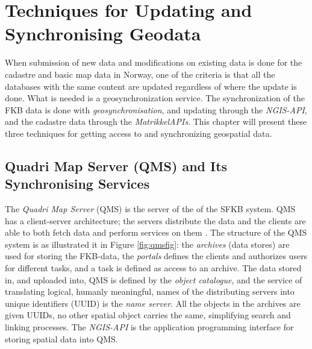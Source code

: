 \chapter{Techniques for Updating and Synchronising Geodata} \label{chap:tech}
When submission of new data and modifications on existing data is done for the cadastre and basic map data in Norway, one of the criteria is that all the databases with the same content are updated regardless of where the update is done. What is needed is a geosynchronization service. The synchronization of the FKB data is done with \textit{geosynchronisation}, and updating through the \textit{NGIS-API}, and the cadastre data through the \textit{MatrikkelAPIs}.  This chapter will present these three techniques for getting access to and synchronizing geospatial data.  


\section{Quadri Map Server (QMS) and Its Synchronising Services}\label{ngis}
The \textit{Quadri Map Server} (QMS) is the server of the of the SFKB system. 
QMS has a client-server architecture; the servers distribute the data and the clients are able to both fetch data and perform services on them \citep{NorkartAS2010}. 
The structure of the QMS system
is as \cite{Kartverket2017} illustrated it in Figure \ref{fig:qmsfig}: the \textit{archives} (data stores) are used for storing the FKB-data, the \textit{portals} defines the clients and authorizes users for different tasks, and a task is defined as access to an archive. The data stored in, and uploaded into, QMS is defined by the \textit{object catalogue}, and the service of translating logical, humanly meaningful, names of the distributing servers into unique identifiers (UUID) is the \textit{name server}. All the objects in the archives are given UUIDs, no other spatial object carries the same, simplifying search and linking processes. 
The \textit{NGIS-API} is the application programming interface for storing spatial data into QMS.%

